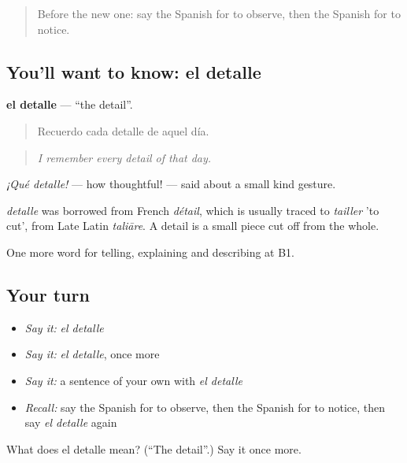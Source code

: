 \label{lesson:ES-C517-detalle}



\begin{quote}
Before the new one: say the Spanish for to observe, then the Spanish for to notice.
\end{quote}

\subsection*{You'll want to know: el detalle}
\textbf{el detalle} — \textquotedblleft{}the detail\textquotedblright{}.

\begin{quote}
Recuerdo cada detalle de aquel día.
\end{quote}

\begin{quote}
\emph{I remember every detail of that day.}
\end{quote}

\emph{¡Qué detalle!} — how thoughtful! — said about a small kind gesture.

\begin{cousinweb}
\emph{detalle} was borrowed from French \emph{détail}, which is usually traced to \emph{tailler} 'to cut', from Late Latin \emph{taliāre}. A detail is a small piece cut off from the whole.
\end{cousinweb}

\begin{grammarlens}[title={What you've built}]
One more word for telling, explaining and describing at B1.
\end{grammarlens}

\subsection*{Your turn}
\begin{itemize}
\raggedright
  \item \emph{Say it:} \emph{el detalle}
  \item \emph{Say it:} \emph{el detalle}, once more
  \item \emph{Say it:} a sentence of your own with \emph{el detalle}
  \item \emph{Recall:} say the Spanish for to observe, then the Spanish for to notice, then say \emph{el detalle} again
\end{itemize}

\begin{tcolorbox}[breakable,colback=teal!4,colframe=teal!35!black,title={Before you move on}]
What does el detalle mean? (\textquotedblleft{}The detail\textquotedblright{}.) Say it once more.
\end{tcolorbox}
